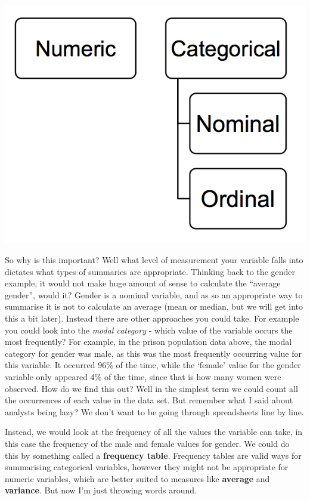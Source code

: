 \documentclass[
]{book}
\begin{document}
\includegraphics{imgs/lvl_msr_diagr.png}

So why is this important? Well what level of measurement your variable falls into dictates what types of summaries are appropriate. Thinking back to the gender example, it would not make huge amount of sense to calculate the ``average gender'', would it? Gender is a nominal variable, and as so an appropriate way to summarise it is not to calculate an average (mean or median, but we will get into this a bit later). Instead there are other approaches you could take. For example you could look into the \emph{modal category} - which value of the variable occurs the most frequently? For example, in the prison population data above, the modal category for gender was male, as this was the most frequently occurring value for this variable. It occurred 96\% of the time, while the `female' value for the gender variable only appeared 4\% of the time, since that is how many women were observed. How do we find this out? Well in the simplest term we could count all the occurrences of each value in the data set. But remember what I said about analysts being lazy? We don't want to be going through spreadsheets line by line.

Instead, we would look at the frequency of all the values the variable can take, in this case the frequency of the male and female values for gender. We could do this by something called a \textbf{frequency table}. Frequency tables are valid ways for summarising categorical variables, however they might not be appropriate for numeric variables, which are better suited to measures like \textbf{average} and \textbf{variance}. But now I'm just throwing words around.
\end{document}
